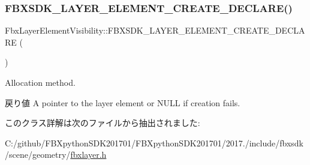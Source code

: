 \subsubsection{\texorpdfstring{F\+B\+X\+S\+D\+K\+\_\+\+L\+A\+Y\+E\+R\+\_\+\+E\+L\+E\+M\+E\+N\+T\+\_\+\+C\+R\+E\+A\+T\+E\+\_\+\+D\+E\+C\+L\+A\+R\+E()}{FBXSDK\_LAYER\_ELEMENT\_CREATE\_DECLARE()}}
{\footnotesize\ttfamily Fbx\+Layer\+Element\+Visibility\+::\+F\+B\+X\+S\+D\+K\+\_\+\+L\+A\+Y\+E\+R\+\_\+\+E\+L\+E\+M\+E\+N\+T\+\_\+\+C\+R\+E\+A\+T\+E\+\_\+\+D\+E\+C\+L\+A\+RE (\begin{DoxyParamCaption}\item[{Layer\+Element\+Visibility}]{ }\end{DoxyParamCaption})}

Allocation method. \begin{DoxyReturn}{戻り値}
A pointer to the layer element or {\ttfamily N\+U\+LL} if creation fails. 
\end{DoxyReturn}


このクラス詳解は次のファイルから抽出されました\+:\begin{DoxyCompactItemize}
\item 
C\+:/github/\+F\+B\+Xpython\+S\+D\+K201701/\+F\+B\+Xpython\+S\+D\+K201701/2017./include/fbxsdk/scene/geometry/\hyperlink{fbxlayer_8h}{fbxlayer.\+h}\end{DoxyCompactItemize}
